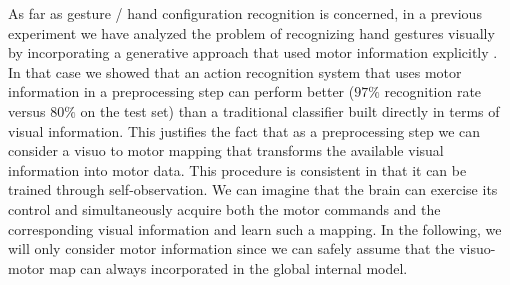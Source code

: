 As far as gesture / hand configuration recognition is concerned, in a
previous experiment we have analyzed the problem of recognizing hand
gestures visually by incorporating a generative approach that used
motor information explicitly \cite{lopes-05,metta-06}. In that case we
showed that an action recognition system that uses motor information
in a preprocessing step can perform better ($97\%$ recognition rate
versus $80\%$ on the test set) than a traditional classifier built
directly in terms of visual information. This justifies the fact that
as a preprocessing step we can consider a visuo to motor mapping that
transforms the available visual information into motor data. This
procedure is consistent in that it can be trained through
self-observation. We can imagine that the brain can exercise its
control and simultaneously acquire both the motor commands and the
corresponding visual information and learn such a mapping. In the
following, we will only consider motor information since we can safely
assume that the visuo-motor map can always incorporated in the global
internal model.
